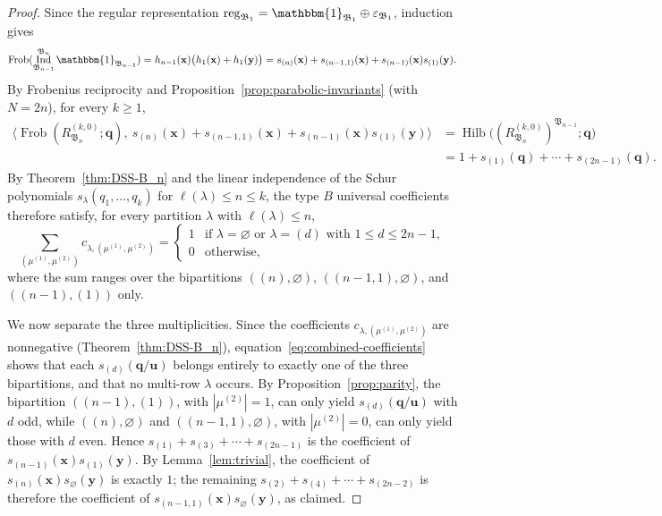 \documentclass[12pt]{amsart}
\theoremstyle{plain}
\theoremstyle{definition}
\DeclareMathOperator{\Frob}{Frob}
\DeclareMathOperator{\Hilb}{Hilb}
\DeclareMathOperator{\Ind}{Ind}
\DeclareMathOperator{\reg}{reg}
\newcommand{\x}{\mathbf{x}}
\newcommand{\y}{\mathbf{y}}
\begin{document}
\begin{proof}
    Since the regular representation $\reg_{\mathfrak{B}_1} = \mathbbm{1}_{\mathfrak{B}_1} \oplus
    \varepsilon_{\mathfrak{B}_1}$, induction gives
    \begin{equation}\label{eq:induction-B_n-1}
        \Frob(\Ind_{\mathfrak{B}_{n-1}}^{\mathfrak{B}_n}
        \mathbbm{1}_{\mathfrak{B}_{n-1}})
        = h_{n-1}(\x)\big(h_{1}(\x) + h_1(\y)\big)
        = s_{(n)}(\x) + s_{(n-1,1)}(\x) + s_{(n-1)}(\x)s_{(1)}(\y).
    \end{equation}
    By Frobenius reciprocity and Proposition~\ref{prop:parabolic-invariants} (with $N = 2n$), for every $k \geq 1$,
    \begin{equation}
    \begin{aligned}
        \langle \Frob(R_{\mathfrak{B}_n}^{(k,0)}; \mathbf{q}),\
        s_{(n)}(\x) + s_{(n-1,1)}(\x) + s_{(n-1)}(\x)s_{(1)}(\y) \rangle
        &= \Hilb\big((R_{\mathfrak{B}_n}^{(k,0)})^{\mathfrak{B}_{n-1}};
        \mathbf{q}\big) \\
        &= 1 + s_{(1)}(\mathbf{q}) + \cdots + s_{(2n-1)}(\mathbf{q}).
    \end{aligned}
    \end{equation}
    By Theorem~\ref{thm:DSS-B_n} and the linear independence of the Schur polynomials $s_\lambda(q_1,\ldots,q_k)$ for $\ell(\lambda) \leq n \leq k$, the type $B$ universal coefficients therefore satisfy, for every partition $\lambda$ with $\ell(\lambda) \leq n$,
    \begin{equation}\label{eq:combined-coefficients}
        \sum_{(\mu^{(1)},\mu^{(2)})}
        c_{\lambda,(\mu^{(1)},\mu^{(2)})} =
        \begin{cases}
            1 & \text{if } \lambda = \varnothing \text{ or }
            \lambda = (d) \text{ with } 1 \leq d \leq 2n-1,\\
            0 & \text{otherwise,}
        \end{cases}
    \end{equation}
    where the sum ranges over the bipartitions $((n),\varnothing)$, $((n-1,1),\varnothing)$, and $((n-1),(1))$ only.

    We now separate the three multiplicities.
    Since the coefficients $c_{\lambda,(\mu^{(1)},\mu^{(2)})}$ are nonnegative (Theorem~\ref{thm:DSS-B_n}), equation~\eqref{eq:combined-coefficients} shows that each $s_{(d)}(\mathbf{q}/\mathbf{u})$ belongs entirely to exactly one of the three bipartitions, and that no multi-row $\lambda$ occurs. 
    By Proposition~\ref{prop:parity}, the bipartition $((n-1),(1))$, with $|\mu^{(2)}| = 1$, can only yield $s_{(d)}(\mathbf{q}/\mathbf{u})$ with $d$ odd, while $((n),\varnothing)$ and $((n-1,1),\varnothing)$, with
    $|\mu^{(2)}| = 0$, can only yield those with $d$ even. 
    Hence $s_{(1)} + s_{(3)} + \cdots + s_{(2n-1)}$ is the coefficient of $s_{(n-1)}(\x)s_{(1)}(\y)$. 
    By Lemma~\ref{lem:trivial}, the coefficient of $s_{(n)}(\x)s_{\varnothing}(\y)$ is exactly $1$; the remaining $s_{(2)} + s_{(4)} + \cdots + s_{(2n-2)}$ is therefore the coefficient of $s_{(n-1,1)}(\x)s_{\varnothing}(\y)$, as claimed.
\end{proof}
\end{document}
